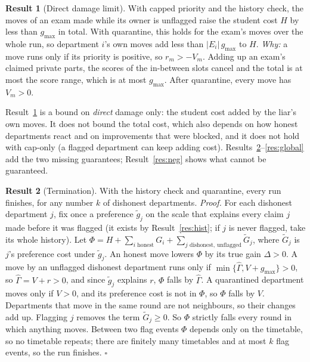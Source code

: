 \documentclass{article}
\theoremstyle{definition}
\newtheorem{result}{Result}
\newcommand{\1}{\mathbf{1}}
\newcommand{\gmax}{g_{\max}}
\begin{document}
\begin{result}[Direct damage limit]
\label{res:bound}
With capped priority and the history check, the moves of an exam made while its owner is unflagged raise the student cost $H$ by less than $\gmax$ in total. With quarantine, this holds for the exam's moves over the whole run, so department $i$'s own moves add less than $|E_i|\,\gmax$ to $H$. \emph{Why:} a move runs only if its priority is positive, so $r_m>-V_m$. Adding up an exam's claimed private parts, the scores of the in-between slots cancel and the total is at most the score range, which is at most $\gmax$. After quarantine, every move has $V_m>0$.
\end{result}
Result~\ref{res:bound} is a bound on \emph{direct} damage only: the student cost added by the liar's own moves. It does not bound the total cost, which also depends on how honest departments react and on improvements that were blocked, and it does not hold with cap-only (a flagged department can keep adding cost). Results~\ref{res:term}--\ref{res:global} add the two missing guarantees; Result~\ref{res:neg} shows what cannot be guaranteed.

\begin{result}[Termination]
\label{res:term}
With the history check and quarantine, every run finishes, for any number $k$ of dishonest departments.
\emph{Proof.} For each dishonest department $j$, fix once a preference $\tilde g_j$ on the scale that explains every claim $j$ made before it was flagged (it exists by Result~\ref{res:hist}; if $j$ is never flagged, take its whole history). Let
$\Phi=H+\sum_{i\text{ honest}}G_i+\sum_{j\text{ dishonest, unflagged}}\tilde G_j$, where $\tilde G_j$ is $j$'s preference cost under $\tilde g_j$.
An honest move lowers $\Phi$ by its true gain $\Delta>0$. A move by an unflagged dishonest department runs only if $\min\{\hat\Gamma,V+\gmax\}>0$, so $\hat\Gamma=V+r>0$, and since $\tilde g_j$ explains $r$, $\Phi$ falls by $\hat\Gamma$. A quarantined department moves only if $V>0$, and its preference cost is not in $\Phi$, so $\Phi$ falls by $V$. Departments that move in the same round are not neighbours, so their changes add up. Flagging $j$ removes the term $\tilde G_j\ge0$. So $\Phi$ strictly falls every round in which anything moves. Between two flag events $\Phi$ depends only on the timetable, so no timetable repeats; there are finitely many timetables and at most $k$ flag events, so the run finishes. $\square$
\end{result}
\end{document}
